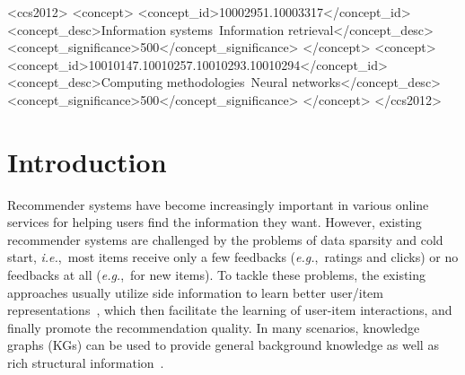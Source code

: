 \documentclass[sigconf]{acmart}
\newcommand{\new}[1]{{\color{black} #1}}
\newcommand{\ie}{\emph{i.e.},~}
\newcommand{\eg}{\emph{e.g.},~}
\begin{document}
\begin{CCSXML}
<ccs2012>
<concept>
<concept_id>10002951.10003317</concept_id>
<concept_desc>Information systems~Information retrieval</concept_desc>
<concept_significance>500</concept_significance>
</concept>
<concept>
<concept_id>10010147.10010257.10010293.10010294</concept_id>
<concept_desc>Computing methodologies~Neural networks</concept_desc>
<concept_significance>500</concept_significance>
</concept>
</ccs2012>
\end{CCSXML}




\maketitle




\section{Introduction}
Recommender systems have become increasingly important in various online services for helping users find the information they want. However, existing recommender systems are challenged by the problems of data sparsity and cold start, \ie most items receive only a few feedbacks (\eg ratings and clicks) or no feedbacks at all (\eg for new items).
\new{To tackle these problems, the existing approaches usually utilize side information to learn better user/item representations~\cite{koren2008factorization, he2018nais, kabbur2013fism}, which then facilitate the learning of user-item interactions, and finally promote the recommendation quality.
In many scenarios, knowledge graphs (KGs) can be used to provide general background knowledge as well as rich structural information~\cite{zhang2016collaborative, wang2018ripplenet, huang2018improving}.}
\end{document}
